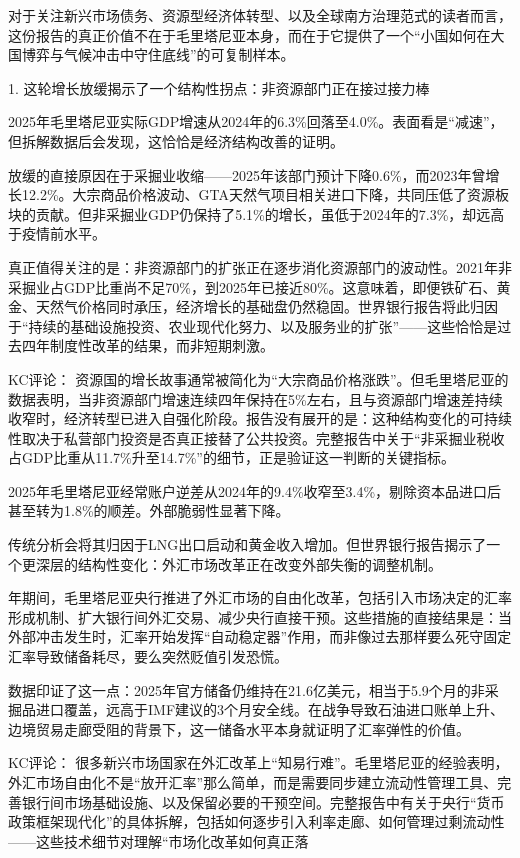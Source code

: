 \documentclass[11pt]{ctexart}
\begin{document}
对于关注新兴市场债务、资源型经济体转型、以及全球南方治理范式的读者而言，这份报告的真正价值不在于毛里塔尼亚本身，而在于它提供了一个“小国如何在大国博弈与气候冲击中守住底线”的可复制样本。

1. 这轮增长放缓揭示了一个结构性拐点：非资源部门正在接过接力棒

2025年毛里塔尼亚实际GDP增速从2024年的6.3\%回落至4.0\%。表面看是“减速”，但拆解数据后会发现，这恰恰是经济结构改善的证明。

放缓的直接原因在于采掘业收缩——2025年该部门预计下降0.6\%，而2023年曾增长12.2\%。大宗商品价格波动、GTA天然气项目相关进口下降，共同压低了资源板块的贡献。但非采掘业GDP仍保持了5.1\%的增长，虽低于2024年的7.3\%，却远高于疫情前水平。

真正值得关注的是：非资源部门的扩张正在逐步消化资源部门的波动性。2021年非采掘业占GDP比重尚不足70\%，到2025年已接近80\%。这意味着，即便铁矿石、黄金、天然气价格同时承压，经济增长的基础盘仍然稳固。世界银行报告将此归因于“持续的基础设施投资、农业现代化努力、以及服务业的扩张”——这些恰恰是过去四年制度性改革的结果，而非短期刺激。

KC评论： 资源国的增长故事通常被简化为“大宗商品价格涨跌”。但毛里塔尼亚的数据表明，当非资源部门增速连续四年保持在5\%左右，且与资源部门增速差持续收窄时，经济转型已进入自强化阶段。报告没有展开的是：这种结构变化的可持续性取决于私营部门投资是否真正接替了公共投资。完整报告中关于“非采掘业税收占GDP比重从11.7\%升至14.7\%”的细节，正是验证这一判断的关键指标。

2025年毛里塔尼亚经常账户逆差从2024年的9.4\%收窄至3.4\%，剔除资本品进口后甚至转为1.8\%的顺差。外部脆弱性显著下降。

传统分析会将其归因于LNG出口启动和黄金收入增加。但世界银行报告揭示了一个更深层的结构性变化：外汇市场改革正在改变外部失衡的调整机制。

年期间，毛里塔尼亚央行推进了外汇市场的自由化改革，包括引入市场决定的汇率形成机制、扩大银行间外汇交易、减少央行直接干预。这些措施的直接结果是：当外部冲击发生时，汇率开始发挥“自动稳定器”作用，而非像过去那样要么死守固定汇率导致储备耗尽，要么突然贬值引发恐慌。

数据印证了这一点：2025年官方储备仍维持在21.6亿美元，相当于5.9个月的非采掘品进口覆盖，远高于IMF建议的3个月安全线。在战争导致石油进口账单上升、边境贸易走廊受阻的背景下，这一储备水平本身就证明了汇率弹性的价值。

KC评论： 很多新兴市场国家在外汇改革上“知易行难”。毛里塔尼亚的经验表明，外汇市场自由化不是“放开汇率”那么简单，而是需要同步建立流动性管理工具、完善银行间市场基础设施、以及保留必要的干预空间。完整报告中有关于央行“货币政策框架现代化”的具体拆解，包括如何逐步引入利率走廊、如何管理过剩流动性——这些技术细节对理解“市场化改革如何真正落
\end{document}
